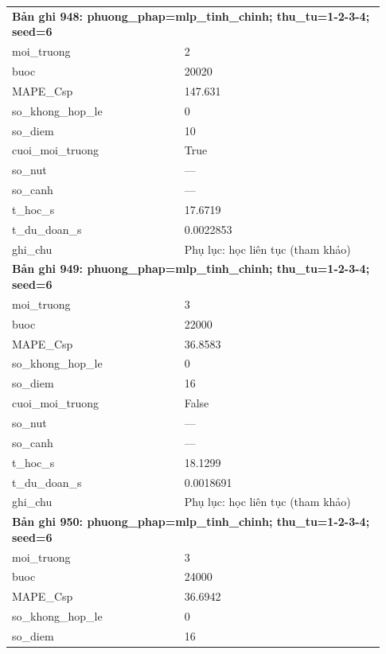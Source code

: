 \begin{longtable}{p{0.43\linewidth}p{0.50\linewidth}}
\midrule
\multicolumn{2}{p{0.95\linewidth}}{\textbf{Bản ghi 948: phuong\_phap=mlp\_tinh\_chinh; thu\_tu=1-2-3-4; seed=6}} \\
moi\_\allowbreak truong & 2 \\
buoc & 20020 \\
MAPE\_\allowbreak Csp & 147.631 \\
so\_\allowbreak khong\_\allowbreak hop\_\allowbreak le & 0 \\
so\_\allowbreak diem & 10 \\
cuoi\_\allowbreak moi\_\allowbreak truong & True \\
so\_\allowbreak nut & — \\
so\_\allowbreak canh & — \\
t\_\allowbreak hoc\_\allowbreak s & 17.6719 \\
t\_\allowbreak du\_\allowbreak doan\_\allowbreak s & 0.0022853 \\
ghi\_\allowbreak chu & Phụ lục: học liên tục (tham khảo) \\
\midrule
\multicolumn{2}{p{0.95\linewidth}}{\textbf{Bản ghi 949: phuong\_phap=mlp\_tinh\_chinh; thu\_tu=1-2-3-4; seed=6}} \\
moi\_\allowbreak truong & 3 \\
buoc & 22000 \\
MAPE\_\allowbreak Csp & 36.8583 \\
so\_\allowbreak khong\_\allowbreak hop\_\allowbreak le & 0 \\
so\_\allowbreak diem & 16 \\
cuoi\_\allowbreak moi\_\allowbreak truong & False \\
so\_\allowbreak nut & — \\
so\_\allowbreak canh & — \\
t\_\allowbreak hoc\_\allowbreak s & 18.1299 \\
t\_\allowbreak du\_\allowbreak doan\_\allowbreak s & 0.0018691 \\
ghi\_\allowbreak chu & Phụ lục: học liên tục (tham khảo) \\
\midrule
\multicolumn{2}{p{0.95\linewidth}}{\textbf{Bản ghi 950: phuong\_phap=mlp\_tinh\_chinh; thu\_tu=1-2-3-4; seed=6}} \\
moi\_\allowbreak truong & 3 \\
buoc & 24000 \\
MAPE\_\allowbreak Csp & 36.6942 \\
so\_\allowbreak khong\_\allowbreak hop\_\allowbreak le & 0 \\
so\_\allowbreak diem & 16 \\

\end{longtable}
